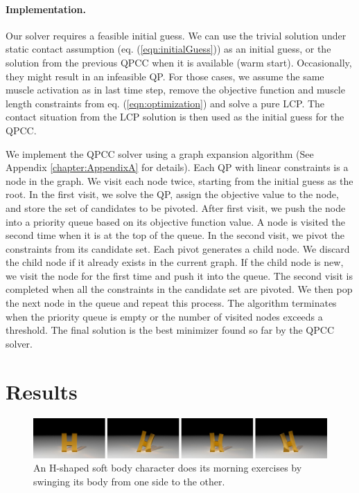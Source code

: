 \paragraph{Implementation.}
Our solver requires a feasible initial guess. We can use the trivial solution under static contact assumption (eq. (\ref{eqn:initialGuess})) as an initial guess, or the solution from the previous QPCC when it is available (warm start). Occasionally, they might result in an infeasible QP. For those cases, we assume the same muscle activation as in last time step, remove the objective function and muscle length constraints from eq. (\ref{eqn:optimization}) and solve a pure LCP. The contact situation from the LCP solution is then used as the initial guess for the QPCC.

We implement the QPCC solver using a graph expansion algorithm (See Appendix \ref{chapter:AppendixA} for details). Each
QP with linear constraints is a node in the graph. We visit each node
twice, starting from the initial guess as the root. In the first
visit, we solve the QP, assign the objective value to the
node, and store the set of candidates to be pivoted. After first
visit, we push the node into a priority queue based on its objective
function value. A node is visited the second time when it is at the
top of the queue. In the second visit, we pivot the constraints from
its candidate set. Each pivot generates a child node. We discard the
child node if it already exists in the current graph. If the child
node is new, we visit the node for the first time and push it into the
queue. The second visit is completed when all the constraints in the
candidate set are pivoted. We then pop the next node in the queue and
repeat this process. The algorithm terminates when the priority queue
is empty or the number of visited nodes exceeds a threshold. The final
solution is the best minimizer found so far by the QPCC solver.

\section{Results}

\label{sec:results}
\begin{figure}[ht]
\centering
\includegraphics[width=\textwidth]{figures/HSwing.eps}
\caption{An H-shaped soft body character does its morning exercises by swinging its body from one side to the other.}
\label{fig:HSwing}
\end{figure}


